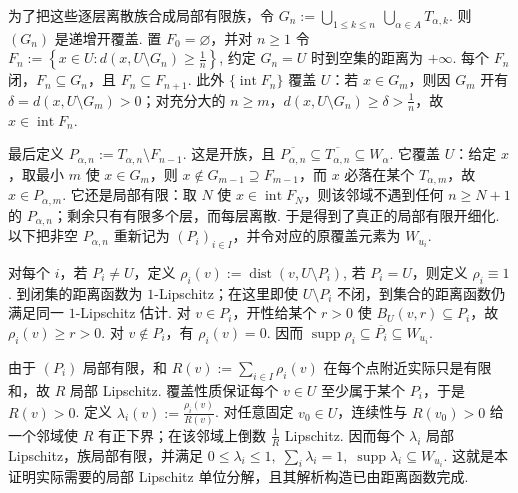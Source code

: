 \begin{FAProof}
为了把这些逐层离散族合成局部有限族，令
\(\displaystyle G_n := \bigcup_{1\leqslant k\leqslant n}\ \bigcup_{\alpha\in A}T_{\alpha,k}\).
则 \(\displaystyle(G_n)\) 是递增开覆盖. 置 \(\displaystyle F_0=\varnothing\)，并对 \(\displaystyle n\geqslant1\) 令
\(\displaystyle F_n := \left\{ x\in U: d(x,U\setminus G_n)\geqslant\frac{1}{n} \right\}\),
约定 \(\displaystyle G_n=U\) 时到空集的距离为 \(\displaystyle+\infty\). 每个 \(\displaystyle F_n\) 闭，\(\displaystyle F_n\subseteq G_n\)，且 \(\displaystyle F_n\subseteq F_{n+1}\). 此外 \(\displaystyle\{\operatorname{int}F_n\}\) 覆盖 \(\displaystyle U\)：若 \(\displaystyle x\in G_m\)，则因 \(\displaystyle G_m\) 开有 \(\displaystyle\delta=d(x,U\setminus G_m)>0\)；对充分大的 \(\displaystyle n\geqslant m\)，\(\displaystyle d(x,U\setminus G_n)\geqslant\delta>\frac{1}{n}\)，故 \(\displaystyle x\in\operatorname{int}F_n\).

最后定义
\(\displaystyle P_{\alpha,n} := T_{\alpha,n}\setminus F_{n-1}\).
这是开族，且 \(\displaystyle\overline{P_{\alpha,n}}\subseteq\overline{T_{\alpha,n}}\subseteq W_\alpha\). 它覆盖 \(\displaystyle U\)：给定 \(\displaystyle x\)，取最小 \(\displaystyle m\) 使 \(\displaystyle x\in G_m\)，则 \(\displaystyle x\notin G_{m-1}\supseteq F_{m-1}\)，而 \(\displaystyle x\) 必落在某个 \(\displaystyle T_{\alpha,m}\)，故 \(\displaystyle x\in P_{\alpha,m}\). 它还是局部有限：取 \(\displaystyle N\) 使 \(\displaystyle x\in\operatorname{int}F_N\)，则该邻域不遇到任何 \(\displaystyle n\geqslant N+1\) 的 \(\displaystyle P_{\alpha,n}\)；剩余只有有限多个层，而每层离散. 于是得到了真正的局部有限开细化. 以下把非空 \(\displaystyle P_{\alpha,n}\) 重新记为 \(\displaystyle(P_i)_{i\in I}\)，并令对应的原覆盖元素为 \(\displaystyle W_{u_i}\).

对每个 \(\displaystyle i\)，若 \(\displaystyle P_i\neq U\)，定义
\(\displaystyle \rho_i(v):=\operatorname{dist}(v,U\setminus P_i)\),
若 \(\displaystyle P_i=U\)，则定义 \(\displaystyle\rho_i\equiv1\). 到闭集的距离函数为 \(\displaystyle1\)-Lipschitz；在这里即使 \(\displaystyle U\setminus P_i\) 不闭，到集合的距离函数仍满足同一 \(\displaystyle1\)-Lipschitz 估计. 对 \(\displaystyle v\in P_i\)，开性给某个 \(\displaystyle r>0\) 使 \(\displaystyle B_U(v,r)\subseteq P_i\)，故 \(\displaystyle\rho_i(v)\geqslant r>0\). 对 \(\displaystyle v\notin P_i\)，有 \(\displaystyle\rho_i(v)=0\). 因而 \(\displaystyle\operatorname{supp}\rho_i\subseteq\overline{P_i}\subseteq W_{u_i}\).

由于 \(\displaystyle(P_i)\) 局部有限，和
\(\displaystyle R(v):=\sum_{i\in I}\rho_i(v)\)
在每个点附近实际只是有限和，故 \(\displaystyle R\) 局部 Lipschitz. 覆盖性质保证每个 \(\displaystyle v\in U\) 至少属于某个 \(\displaystyle P_i\)，于是 \(\displaystyle R(v)>0\). 定义
\(\displaystyle \lambda_i(v):=\frac{\rho_i(v)}{R(v)}\).
对任意固定 \(\displaystyle v_0\in U\)，连续性与 \(\displaystyle R(v_0)>0\) 给一个邻域使 \(\displaystyle R\) 有正下界；在该邻域上倒数 \(\displaystyle\frac{1}{R}\) Lipschitz. 因而每个 \(\displaystyle\lambda_i\) 局部 Lipschitz，族局部有限，并满足
\(\displaystyle 0\leqslant\lambda_i\leqslant1, \; \sum_i\lambda_i=1, \; \operatorname{supp}\lambda_i\subseteq W_{u_i}\).
这就是本证明实际需要的局部 Lipschitz 单位分解，且其解析构造已由距离函数完成.


\end{FAProof}
